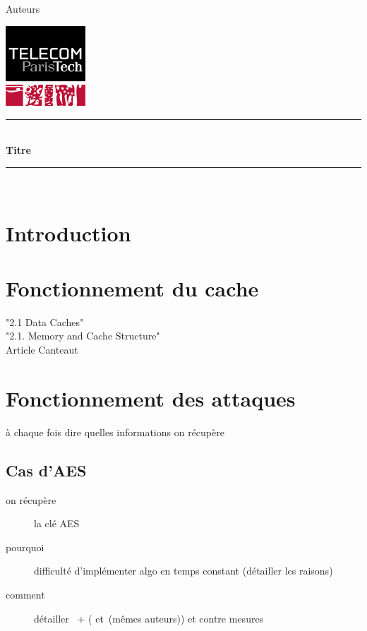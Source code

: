 \documentclass[a4paper,11pt]{article}
\newcommand{\HRule}{\rule{\linewidth}{0.5mm}}
\newcommand{\reporttitle}{Titre}
\newcommand{\reportauthor}{Auteurs}
\begin{document}
	

\begin{center}

\begin{minipage}[t]{0.4\textwidth}
  \begin{flushleft} \large
    \reportauthor
  \vfill
  \end{flushleft}
\end{minipage}
\begin{minipage}[t]{0.5\textwidth}
  \begin{flushright}
  \includegraphics [width=30mm]{figures/tpt.jpg} \\[0.5cm]
  \end{flushright}
\end{minipage}
\HRule \\[0.5cm]
{\huge \bfseries \reporttitle}\\[0.3cm]
\HRule \\[1.5cm]

\end{center}

\section*{Introduction}

\section{Fonctionnement du cache}

"2.1 Data Caches"~\cite{brumley2009cache}\\
"2.1. Memory and Cache Structure"~\cite{tromer2010efficient}\\
Article Canteaut~\cite{canteaut2006understanding}

\section{Fonctionnement des attaques}

à chaque fois dire quelles informations on récupère

\subsection{Cas d'AES}
\begin{description}
\item[on récupère] la clé AES
\item[pourquoi] difficulté d'implémenter algo en temps constant (détailler les raisons)
\item[comment] détailler~\cite{bernstein2005cache} + (\cite{tromer2010efficient} et~\cite{osvik2006cache}(mêmes auteurs)) et contre mesures 
\end{description}
\end{document}
